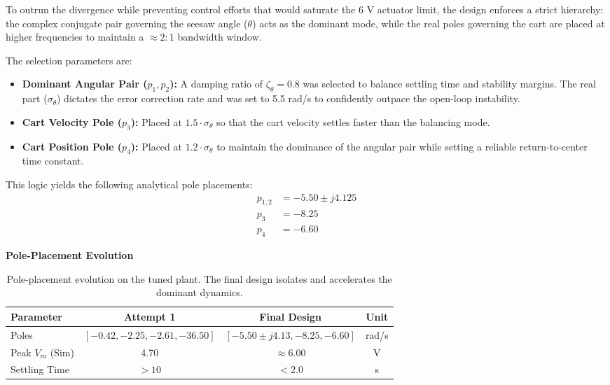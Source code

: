\documentclass[11pt,a4paper]{article}
\begin{document}
To outrun the divergence while preventing control efforts that would saturate the 6 V actuator limit, the design enforces a strict hierarchy: the complex conjugate pair governing the seesaw angle ($\theta$) acts as the dominant mode, while the real poles governing the cart are placed at higher frequencies to maintain a $\approx 2:1$ bandwidth window.

The selection parameters are:
\begin{itemize}
    \item \textbf{Dominant Angular Pair ($p_{1}, p_{2}$):} A damping ratio of $\zeta_{\theta} = 0.8$ was selected to balance settling time and stability margins. The real part ($\sigma_{\theta}$) dictates the error correction rate and was set to 5.5 rad/s to confidently outpace the open-loop instability. 
    \item \textbf{Cart Velocity Pole ($p_{3}$):} Placed at $1.5 \cdot \sigma_{\theta}$ so that the cart velocity settles faster than the balancing mode.
    \item \textbf{Cart Position Pole ($p_{4}$):} Placed at $1.2 \cdot \sigma_{\theta}$ to maintain the dominance of the angular pair while setting a reliable return-to-center time constant.
\end{itemize}

This logic yields the following analytical pole placements:
\begin{equation}
\begin{aligned}
    p_{1,2} &= -5.50 \pm j4.125 \\
    p_{3} &= -8.25 \\
    p_{4} &= -6.60
\end{aligned}
\end{equation}

\begin{table}[H]
\caption*{\textbf{Pole-Placement Evolution}}
\centering
\begin{tabular}{|p{9em} c c c |}
\hline
\rowcolor{bluePoli!40}
\textbf{Parameter} & \textbf{Attempt 1} & \textbf{Final Design} & \textbf{Unit} \T\B \\
\hline \hline
Poles & $[-0.42, -2.25, -2.61, -36.50]$ & $[-5.50\pm j4.13, -8.25, -6.60]$ & rad/s \T\B \\
Peak $V_{m}$ (Sim) & 4.70 & $\approx 6.00$ & V \T\B \\
Settling Time & $> 10$ & $< 2.0$ & s \B \\
\hline
\end{tabular}
\caption{Pole-placement evolution on the tuned plant. The final design isolates and accelerates the dominant dynamics.}
\label{table:pole_evolution}
\end{table}
\end{document}
